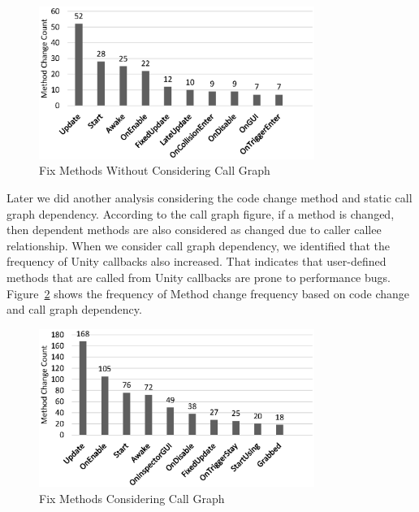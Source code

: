 \begin{figure}[t]
	\centering
	\includegraphics[width=0.8\textwidth]{figure/rq2_2.eps}
	\caption{Fix Methods Without Considering Call Graph}
	\label{figure:rq2fixmethod}
\end{figure}


Later we did another analysis considering the code change method and static call graph dependency. According to the call graph figure, if a method is changed, then dependent methods are also considered as changed due to caller callee relationship. When we consider call graph dependency, we identified that the frequency of Unity callbacks also increased. That indicates that user-defined methods that are called from Unity callbacks are prone to performance bugs. Figure~\ref{figure:rq2fixmethodcallgraph} shows the frequency of Method change frequency based on code change and call graph dependency. 

\begin{figure}[t]
	\centering
	\includegraphics[width=0.8\textwidth]{figure/rq2_3.eps}
	\caption{Fix Methods Considering Call Graph}
	\label{figure:rq2fixmethodcallgraph}
\end{figure}

